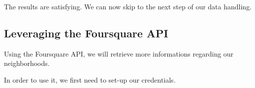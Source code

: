 \documentclass[11pt]{article}
\makeatletter
\newcommand{\boxspacing}{\kern\kvtcb@left@rule\kern\kvtcb@boxsep}
\newcommand{\prompt}[4]{
        \ttfamily\llap{{\color{#2}[#3]:\hspace{3pt}#4}}\vspace{-\baselineskip}
    }
\makeatother
\begin{document}


        
    The results are satisfying. We can now skip to the next step of our data
handling.

    \hypertarget{leveraging-the-foursquare-api}{%
\subsection{Leveraging the Foursquare
API}\label{leveraging-the-foursquare-api}}

Using the Foursquare API, we will retrieve more informations regarding
our neighborhoods.

    In order to use it, we first need to set-up our credentials.

\end{document}
